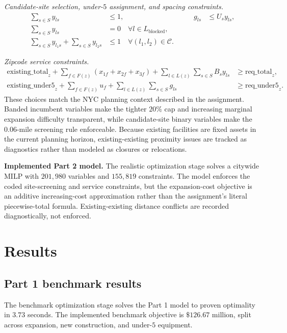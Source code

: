 \documentclass[11pt]{article}
\begin{document}
\noindent\textit{Candidate-site selection, under-\(5\) assignment, and spacing constraints.}
\[
\begin{alignedat}{2}
\sum_{s \in S} y_{ls} &\le 1, &\qquad
g_{ls} &\le U_s y_{ls},\\
\sum_{s \in S} y_{ls} &= 0 \quad \forall l \in L_{\text{blocked}},\\
\sum_{s \in S} y_{l_1s} + \sum_{s \in S} y_{l_2s} &\le 1 \quad \forall (l_1,l_2)\in \mathcal{C}.
\end{alignedat}
\]

\noindent\textit{Zipcode service constraints.}
\[
\begin{aligned}
\mathrm{existing\_total}_z + \sum_{f \in F(z)}(x_{1f}+x_{2f}+x_{3f}) + \sum_{l \in L(z)}\sum_{s \in S} B_s y_{ls}
&\ge \mathrm{req\_total}_z,\\
\mathrm{existing\_under5}_z + \sum_{f \in F(z)}u_f + \sum_{l \in L(z)}\sum_{s \in S} g_{ls}
&\ge \mathrm{req\_under5}_z.
\end{aligned}
\]
These choices match the NYC planning context described in the assignment. Banded incumbent variables make the tighter \(20\%\) cap and increasing marginal expansion difficulty transparent, while candidate-site binary variables make the \(0.06\)-mile screening rule enforceable. Because existing facilities are fixed assets in the current planning horizon, existing-existing proximity issues are tracked as diagnostics rather than modeled as closures or relocations.

\begin{resultbox}
\textbf{Implemented Part 2 model.}
The realistic optimization stage solves a citywide MILP with \(201{,}980\) variables and \(155{,}819\) constraints. The model enforces the coded site-screening and service constraints, but the expansion-cost objective is an additive increasing-cost approximation rather than the assignment's literal piecewise-total formula. Existing-existing distance conflicts are recorded diagnostically, not enforced.
\end{resultbox}

\section{Results}

\subsection{Part 1 benchmark results}

The benchmark optimization stage solves the Part 1 model to proven optimality in \(3.73\) seconds. The implemented benchmark objective is \(\$126.67\) million, split across expansion, new construction, and under-\(5\) equipment.
\end{document}
